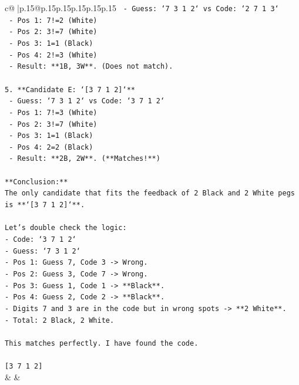 \documentclass{article}
\begin{document}
{\begin{supertabular}{c@{$\;$}|p{.15\linewidth}@{}p{.15\linewidth}p{.15\linewidth}p{.15\linewidth}p{.15\linewidth}p{.15\linewidth}}
{{{\texttt{    {-} Guess: `7 3 1 2` vs Code: `2 7 1 3`} \\
\texttt{    {-} Pos 1: 7!=2 (White)} \\
\texttt{    {-} Pos 2: 3!=7 (White)} \\
\texttt{    {-} Pos 3: 1=1 (Black)} \\
\texttt{    {-} Pos 4: 2!=3 (White)} \\
\texttt{    {-} Result: **1B, 3W**. (Does not match).} \\
\\ 
\texttt{5.  **Candidate E: `{[}3 7 1 2{]}`**} \\
\texttt{    {-} Guess: `7 3 1 2` vs Code: `3 7 1 2`} \\
\texttt{    {-} Pos 1: 7!=3 (White)} \\
\texttt{    {-} Pos 2: 3!=7 (White)} \\
\texttt{    {-} Pos 3: 1=1 (Black)} \\
\texttt{    {-} Pos 4: 2=2 (Black)} \\
\texttt{    {-} Result: **2B, 2W**. (**Matches!**)} \\
\\ 
\texttt{**Conclusion:**} \\
\texttt{The only candidate that fits the feedback of 2 Black and 2 White pegs is **`{[}3 7 1 2{]}`**.} \\
\\ 
\texttt{Let's double check the logic:} \\
\texttt{{-} Code: `3 7 1 2`} \\
\texttt{{-} Guess: `7 3 1 2`} \\
\texttt{{-} Pos 1: Guess 7, Code 3 {-}> Wrong.} \\
\texttt{{-} Pos 2: Guess 3, Code 7 {-}> Wrong.} \\
\texttt{{-} Pos 3: Guess 1, Code 1 {-}> **Black**.} \\
\texttt{{-} Pos 4: Guess 2, Code 2 {-}> **Black**.} \\
\texttt{{-} Digits 7 and 3 are in the code but in wrong spots {-}> **2 White**.} \\
\texttt{{-} Total: 2 Black, 2 White.} \\
\\ 
\texttt{This matches perfectly. I have found the code.} \\
\\ 
\texttt{{[}3 7 1 2{]}} \\
            }
        }
    }
    & & \\ \\


\end{supertabular}}
\end{document}
